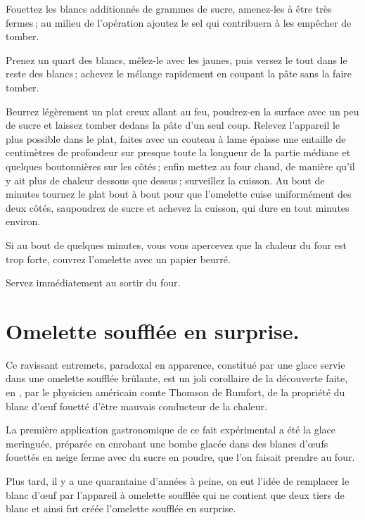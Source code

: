 Fouettez les blancs additionnés de {\mmm} grammes de sucre, amenez-les
à être très fermes ; au milieu de l'opération ajoutez le sel qui contribuera
à les empêcher de tomber.

Prenez un quart des blancs, mêlez-le avec les jaunes, puis versez le tout dans
le reste des blancs ; achevez le mélange rapidement en coupant la pâte sans la
faire tomber.

Beurrez légèrement un plat creux allant au feu, poudrez-en la surface avec un
peu de sucre et laissez tomber dedans la pâte d'un seul coup. Relevez
l'appareil le plus possible dans le plat, faites avec un couteau à lame épaisse
une entaille de {\mmm} centimètres de profondeur sur presque toute la
longueur de la partie médiane et quelques boutonnières sur les côtés ; enfin
mettez au four chaud, de manière qu'il y ait plus de chaleur dessous que
dessus ; surveillez la cuisson. Au bout de {\mmm} minutes tournez le plat
bout à bout pour que l'omelette cuise uniformément des deux côtés, saupoudrez
de sucre et achevez la cuisson, qui dure en tout {\mmm} minutes environ.

Si au bout de quelques minutes, vous vous apercevez que la chaleur du four
est trop forte, couvrez l’omelette avec un papier beurré.

Servez immédiatement au sortir du four.

\section*{\centering Omelette soufflée en surprise.}
{}

Ce ravissant entremets, paradoxal en apparence, constitué par une glace servie
dans une omelette soufflée brûlante, est un joli corollaire de la découverte
faite, en {\mmm}, par le physicien américain comte Thomson de Rumfort,
de la propriété du blanc d'œuf fouetté d'être mauvais conducteur de la chaleur.

La première application gastronomique de ce fait expérimental a été la glace
meringuée, préparée en enrobant une bombe glacée dans des blancs d'œufs
fouettés en neige ferme avec du sucre en poudre, que l’on faisait prendre au
four.

Plus tard, il y a une quarantaine d'années à peine, on eut l'idée de remplacer
le blanc d'œuf par l'appareil à omelette soufflée qui ne contient que deux
tiers de blanc et ainsi fut créée l'omelette soufflée en surprise.

